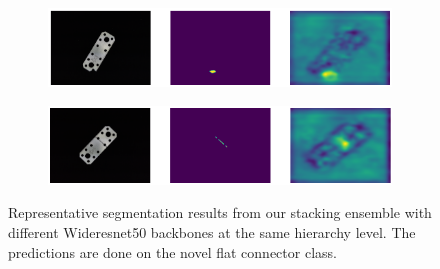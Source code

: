 \begin{figure}[htbp]
\begin{subfigure}[b]{0.3\textwidth}
    \end{subfigure}
    \begin{subfigure}[b]{0.3\textwidth}
        \centering
        \includegraphics[width=\textwidth]{figures/ensembleimagesFC/image_prediction_073.png}


    \end{subfigure}
    \begin{subfigure}[b]{0.3\textwidth}
        \centering
        \includegraphics[width=\textwidth]{figures/ensembleimagesFC/image_prediction_085.png}


    \end{subfigure}
    \caption{Representative segmentation results from our stacking ensemble with different Wideresnet50 backbones at the same hierarchy level. The predictions are done on the novel flat 
             connector class.}
    \label{fig:ensembleFCimages}
\end{figure}